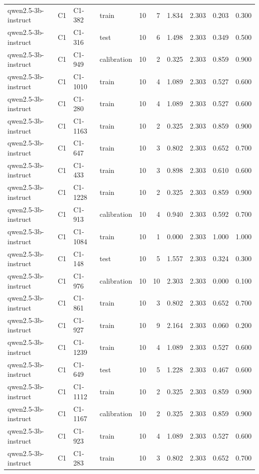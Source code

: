\begin{table}
\begin{tabular}{llllrrrrrr}
qwen2.5-3b-instruct & C1 & C1-382 & train & 10 & 7 & 1.834 & 2.303 & 0.203 & 0.300 \\
qwen2.5-3b-instruct & C1 & C1-316 & test & 10 & 6 & 1.498 & 2.303 & 0.349 & 0.500 \\
qwen2.5-3b-instruct & C1 & C1-949 & calibration & 10 & 2 & 0.325 & 2.303 & 0.859 & 0.900 \\
qwen2.5-3b-instruct & C1 & C1-1010 & train & 10 & 4 & 1.089 & 2.303 & 0.527 & 0.600 \\
qwen2.5-3b-instruct & C1 & C1-280 & train & 10 & 4 & 1.089 & 2.303 & 0.527 & 0.600 \\
qwen2.5-3b-instruct & C1 & C1-1163 & train & 10 & 2 & 0.325 & 2.303 & 0.859 & 0.900 \\
qwen2.5-3b-instruct & C1 & C1-647 & train & 10 & 3 & 0.802 & 2.303 & 0.652 & 0.700 \\
qwen2.5-3b-instruct & C1 & C1-433 & train & 10 & 3 & 0.898 & 2.303 & 0.610 & 0.600 \\
qwen2.5-3b-instruct & C1 & C1-1228 & train & 10 & 2 & 0.325 & 2.303 & 0.859 & 0.900 \\
qwen2.5-3b-instruct & C1 & C1-913 & calibration & 10 & 4 & 0.940 & 2.303 & 0.592 & 0.700 \\
qwen2.5-3b-instruct & C1 & C1-1084 & train & 10 & 1 & 0.000 & 2.303 & 1.000 & 1.000 \\
qwen2.5-3b-instruct & C1 & C1-148 & test & 10 & 5 & 1.557 & 2.303 & 0.324 & 0.300 \\
qwen2.5-3b-instruct & C1 & C1-976 & calibration & 10 & 10 & 2.303 & 2.303 & 0.000 & 0.100 \\
qwen2.5-3b-instruct & C1 & C1-861 & train & 10 & 3 & 0.802 & 2.303 & 0.652 & 0.700 \\
qwen2.5-3b-instruct & C1 & C1-927 & train & 10 & 9 & 2.164 & 2.303 & 0.060 & 0.200 \\
qwen2.5-3b-instruct & C1 & C1-1239 & train & 10 & 4 & 1.089 & 2.303 & 0.527 & 0.600 \\
qwen2.5-3b-instruct & C1 & C1-649 & test & 10 & 5 & 1.228 & 2.303 & 0.467 & 0.600 \\
qwen2.5-3b-instruct & C1 & C1-1112 & train & 10 & 2 & 0.325 & 2.303 & 0.859 & 0.900 \\
qwen2.5-3b-instruct & C1 & C1-1167 & calibration & 10 & 2 & 0.325 & 2.303 & 0.859 & 0.900 \\
qwen2.5-3b-instruct & C1 & C1-923 & train & 10 & 4 & 1.089 & 2.303 & 0.527 & 0.600 \\
qwen2.5-3b-instruct & C1 & C1-283 & train & 10 & 3 & 0.802 & 2.303 & 0.652 & 0.700 \\

\end{tabular}
\end{table}
